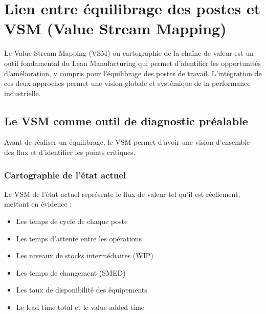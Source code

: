 \documentclass[12pt,a4paper]{article}
\begin{document}
\section{Lien entre équilibrage des postes et VSM (Value Stream Mapping)}

Le Value Stream Mapping (VSM) ou cartographie de la chaîne de valeur est un outil fondamental du Lean Manufacturing qui permet d'identifier les opportunités d'amélioration, y compris pour l'équilibrage des postes de travail. L'intégration de ces deux approches permet une vision globale et systémique de la performance industrielle.

\subsection{Le VSM comme outil de diagnostic préalable}

Avant de réaliser un équilibrage, le VSM permet d'avoir une vision d'ensemble des flux et d'identifier les points critiques.

\subsubsection{Cartographie de l'état actuel}

Le VSM de l'état actuel représente le flux de valeur tel qu'il est réellement, mettant en évidence :

\begin{itemize}
    \item Les temps de cycle de chaque poste
    \item Les temps d'attente entre les opérations
    \item Les niveaux de stocks intermédiaires (WIP)
    \item Les temps de changement (SMED)
    \item Les taux de disponibilité des équipements
    \item Le lead time total et le value-added time
\end{itemize}
\end{document}
